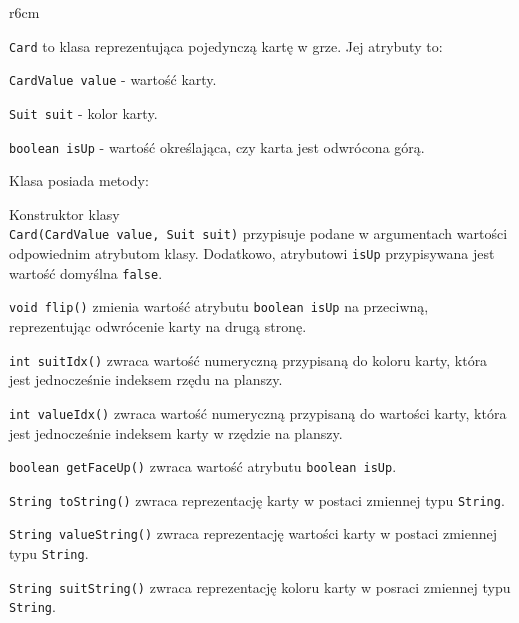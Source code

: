 \documentclass{article}
\begin{document}
\begin{wrapfigure}{r}{6cm}
\end{wrapfigure}

\texttt{Card} to klasa reprezentująca pojedynczą kartę w grze. Jej atrybuty to:

\texttt{CardValue value} - wartość karty.

\texttt{Suit suit} - kolor karty.

\texttt{boolean isUp} - wartość określająca, czy karta jest odwrócona górą.

Klasa posiada metody:

Konstruktor klasy\\\texttt{Card(CardValue value, Suit suit)} przypisuje podane w argumentach wartości odpowiednim atrybutom klasy. Dodatkowo, atrybutowi \texttt{isUp} przypisywana jest wartość domyślna \texttt{false}.

\texttt{void flip()} zmienia wartość atrybutu \texttt{boolean isUp} na przeciwną, reprezentując odwrócenie karty na drugą stronę.

\texttt{int suitIdx()} zwraca wartość numeryczną przypisaną do koloru karty, która jest jednocześnie indeksem rzędu na planszy.

\texttt{int valueIdx()} zwraca wartość numeryczną przypisaną do wartości karty, która jest jednocześnie indeksem karty w rzędzie na planszy.

\texttt{boolean getFaceUp()} zwraca wartość atrybutu \texttt{boolean isUp}.

\texttt{String toString()} zwraca reprezentację karty w postaci zmiennej typu \texttt{String}.

\texttt{String valueString()} zwraca reprezentację wartości karty w postaci zmiennej typu \texttt{String}.

\texttt{String suitString()} zwraca reprezentację koloru karty w posraci zmiennej typu \texttt{String}.
\end{document}
